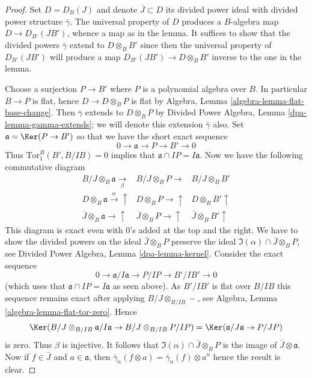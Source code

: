 \begin{proof}
Set $D = D_B(J)$ and denote $\bar J \subset D$ its divided power ideal
with divided power structure $\bar\gamma$. The universal property of
$D$ produces a $B$-algebra map $D \to D_{B'}(JB')$, whence a map as in
the lemma. It suffices to show that
the divided powers $\bar\gamma$ extend to $D \otimes_B B'$ since then
the universal property of $D_{B'}(JB')$ will produce a map
$D_{B'}(JB') \to D \otimes_B B'$ inverse to the one in the lemma.

\medskip\noindent
Choose a surjection $P \to B'$ where $P$ is a polynomial algebra over $B$.
In particular $B \to P$ is flat, hence $D \to D \otimes_B P$ is flat by
Algebra, Lemma \ref{algebra-lemma-flat-base-change}.
Then $\bar\gamma$ extends to $D \otimes_B P$ by
Divided Power Algebra, Lemma \ref{dpa-lemma-gamma-extends}; we
will denote this extension
$\bar\gamma$ also. Set $\mathfrak a = \Ker(P \to B')$ so that
we have the short exact sequence
$$
0 \to \mathfrak a \to P \to B' \to 0
$$
Thus $\text{Tor}_1^B(B', B/IB) = 0$ implies that
$\mathfrak a \cap IP = I\mathfrak a$.
Now we have the following commutative diagram
$$
\begin{array}{ccc}B/J \otimes_B \mathfrak a \underset{\beta}{\longrightarrow} & B/J \otimes_B P \longrightarrow & B/J \otimes_B B' \\ D \otimes_B \mathfrak a \overset{\alpha}{\longrightarrow}\uparrow & D \otimes_B P \longrightarrow\uparrow & D \otimes_B B' \uparrow \\ \bar J \otimes_B \mathfrak a \longrightarrow\uparrow & \bar J \otimes_B P \longrightarrow\uparrow & \bar J \otimes_B B' \uparrow\end{array}
$$
This diagram is exact even with $0$'s added at the top and the right.
We have to show the divided powers on the ideal
$\bar J \otimes_B P$ preserve the ideal
$\Im(\alpha) \cap \bar J \otimes_B P$, see
Divided Power Algebra, Lemma \ref{dpa-lemma-kernel}.
Consider the exact sequence
$$
0 \to \mathfrak a/I\mathfrak a \to P/IP \to B'/IB' \to 0
$$
(which uses that $\mathfrak a \cap IP = I\mathfrak a$ as seen above).
As $B'/IB'$ is flat over $B/IB$ this sequence remains exact after
applying $B/J \otimes_{B/IB} -$, see
Algebra, Lemma \ref{algebra-lemma-flat-tor-zero}. Hence
$$
\Ker(B/J \otimes_{B/IB} \mathfrak a/I\mathfrak a \to
B/J \otimes_{B/IB} P/IP) =
\Ker(\mathfrak a/J\mathfrak a \to P/JP)
$$
is zero. Thus $\beta$ is injective. It follows that
$\Im(\alpha) \cap \bar J \otimes_B P$ is the
image of $\bar J \otimes \mathfrak a$. Now if
$f \in \bar J$ and $a \in \mathfrak a$, then
$\bar\gamma_n(f \otimes a) = \bar\gamma_n(f) \otimes a^n$
hence the result is clear.
\end{proof}

